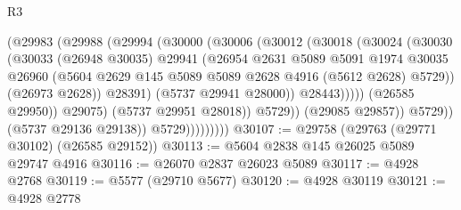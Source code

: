 \begin{lexlean}{R3}
\begin{coremodule}
                                    (@29983
                                      (@29988
                                        (@29994
                                          (@30000
                                            (@30006
                                              (@30012
                                                (@30018
                                                  (@30024
                                                    (@30030
                                                      (@30033
                                                        (@26948 @30035)
                                                        @29941
                                                        (@26954
                                                          @2631
                                                          @5089
                                                          @5091
                                                          @1974
                                                          @30035
                                                          @26960
                                                          (@5604
                                                            @2629
                                                            @145
                                                            @5089
                                                            @5089
                                                            @2628
                                                            @4916
                                                            (@5612 @2628)
                                                            @5729))
                                                        (@26973 @2628))
                                                      @28391)
                                                    (@5737 @29941 @28000))
                                                  @28443)))))
                                        (@26585 @29950))
                                      @29075)
                                    (@5737 @29951 @28018))
                                  @5729))
                              (@29085 @29857))
                            @5729))
                        (@5737 @29136 @29138))
                      @5729)))))))))
@30107 := @29758 (@29763 (@29771 @30102) (@26585 @29152))
@30113 := @5604 @2838 @145 @26025 @5089 @29747 @4916
@30116 := @26070 @2837 @26023 @5089
@30117 := @4928 @2768
@30119 := @5577 (@29710 @5677)
@30120 := @4928 @30119
@30121 := @4928 @2778

\end{coremodule}
\end{lexlean}
